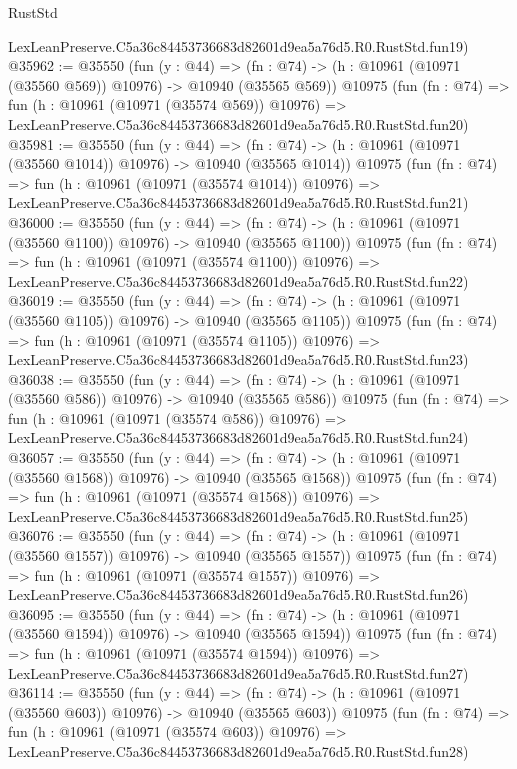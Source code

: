 \begin{lexlean}{RustStd}
\begin{coremodule}
    LexLeanPreserve.C5a36c84453736683d82601d9ea5a76d5.R0.RustStd.fun19)
@35962 := @35550
    (fun (y : @44) =>
    (fn : @74) -> (h : @10961 (@10971 (@35560 @569)) @10976) -> @10940 (@35565 @569))
    @10975
    (fun (fn : @74) =>
    fun (h : @10961 (@10971 (@35574 @569)) @10976) =>
    LexLeanPreserve.C5a36c84453736683d82601d9ea5a76d5.R0.RustStd.fun20)
@35981 := @35550
    (fun (y : @44) =>
    (fn : @74) -> (h : @10961 (@10971 (@35560 @1014)) @10976) -> @10940 (@35565 @1014))
    @10975
    (fun (fn : @74) =>
    fun (h : @10961 (@10971 (@35574 @1014)) @10976) =>
    LexLeanPreserve.C5a36c84453736683d82601d9ea5a76d5.R0.RustStd.fun21)
@36000 := @35550
    (fun (y : @44) =>
    (fn : @74) -> (h : @10961 (@10971 (@35560 @1100)) @10976) -> @10940 (@35565 @1100))
    @10975
    (fun (fn : @74) =>
    fun (h : @10961 (@10971 (@35574 @1100)) @10976) =>
    LexLeanPreserve.C5a36c84453736683d82601d9ea5a76d5.R0.RustStd.fun22)
@36019 := @35550
    (fun (y : @44) =>
    (fn : @74) -> (h : @10961 (@10971 (@35560 @1105)) @10976) -> @10940 (@35565 @1105))
    @10975
    (fun (fn : @74) =>
    fun (h : @10961 (@10971 (@35574 @1105)) @10976) =>
    LexLeanPreserve.C5a36c84453736683d82601d9ea5a76d5.R0.RustStd.fun23)
@36038 := @35550
    (fun (y : @44) =>
    (fn : @74) -> (h : @10961 (@10971 (@35560 @586)) @10976) -> @10940 (@35565 @586))
    @10975
    (fun (fn : @74) =>
    fun (h : @10961 (@10971 (@35574 @586)) @10976) =>
    LexLeanPreserve.C5a36c84453736683d82601d9ea5a76d5.R0.RustStd.fun24)
@36057 := @35550
    (fun (y : @44) =>
    (fn : @74) -> (h : @10961 (@10971 (@35560 @1568)) @10976) -> @10940 (@35565 @1568))
    @10975
    (fun (fn : @74) =>
    fun (h : @10961 (@10971 (@35574 @1568)) @10976) =>
    LexLeanPreserve.C5a36c84453736683d82601d9ea5a76d5.R0.RustStd.fun25)
@36076 := @35550
    (fun (y : @44) =>
    (fn : @74) -> (h : @10961 (@10971 (@35560 @1557)) @10976) -> @10940 (@35565 @1557))
    @10975
    (fun (fn : @74) =>
    fun (h : @10961 (@10971 (@35574 @1557)) @10976) =>
    LexLeanPreserve.C5a36c84453736683d82601d9ea5a76d5.R0.RustStd.fun26)
@36095 := @35550
    (fun (y : @44) =>
    (fn : @74) -> (h : @10961 (@10971 (@35560 @1594)) @10976) -> @10940 (@35565 @1594))
    @10975
    (fun (fn : @74) =>
    fun (h : @10961 (@10971 (@35574 @1594)) @10976) =>
    LexLeanPreserve.C5a36c84453736683d82601d9ea5a76d5.R0.RustStd.fun27)
@36114 := @35550
    (fun (y : @44) =>
    (fn : @74) -> (h : @10961 (@10971 (@35560 @603)) @10976) -> @10940 (@35565 @603))
    @10975
    (fun (fn : @74) =>
    fun (h : @10961 (@10971 (@35574 @603)) @10976) =>
    LexLeanPreserve.C5a36c84453736683d82601d9ea5a76d5.R0.RustStd.fun28)

\end{coremodule}
\end{lexlean}
